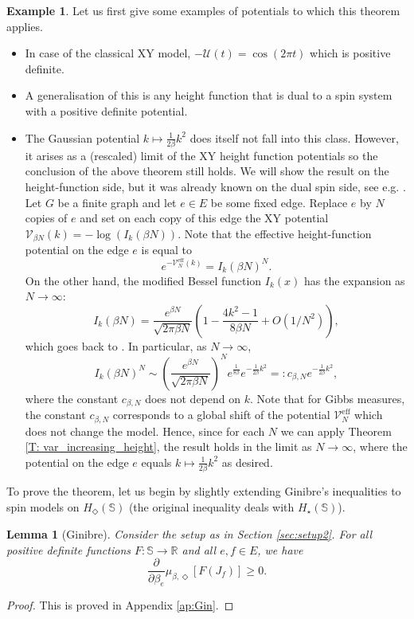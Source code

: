 \documentclass[11pt, reqno]{amsart}
\newtheorem{lemma}[theorem]{Lemma}
\numberwithin{equation}{section}
\theoremstyle{definition}
\newtheorem{example}{Example}
\theoremstyle{remark}
\newcommand{\RR}{\mathbb{R}}
\renewcommand{\c}[1]{\ensuremath{\mathcal{#1}}}
\newcommand{\J}{J}
\newcommand{\exact}{\star}
\newcommand{\coclosed}{\Diamond}
\newcommand{\Hstar}{\ensuremath{H_{\Diamond}} }
\begin{document}
\begin{example} Let us first give some examples of potentials to which this theorem applies. 
	\begin{itemize}
		\item In case of the classical XY model, $-\c{U}(t) = \cos(2\pi t)$ which is positive definite. 
		\item A generalisation of this is any height function that is dual to a spin system with a positive definite potential.
		\item The Gaussian potential $k \mapsto \frac{1}{2\beta} k^2$ does itself not fall into this class. 
		However, it arises as a (rescaled) limit of the XY height function potentials so the conclusion of the above theorem still holds. 
		We will show the result on the height-function side, but it was already known on the dual spin side, see e.g. \cite{NewWu, AHPS}. 
		Let $G$ be a finite graph and let $e \in E$ be some fixed edge. 
		Replace $e$ by $N$ copies of $e$ and set on each copy of this edge the XY potential $\c{V}_{\beta N}(k) = -\log(I_{k}(\beta N))$. 
		Note that the effective height-function potential on the edge $e$ is equal to
		\[
			e^{-\c{V}^{\mathrm{eff}}_N(k)} = I_k(\beta N)^N. 
		\]
		On the other hand, the modified Bessel function $I_k(x)$ has the expansion as $N\to \infty$:
		\[
			I_k(\beta N) = \frac{e^{\beta N}}{ \sqrt{2\pi \beta N}} \left(1 - \frac{4k^2 - 1}{8\beta N} + O(1 / N^2)\right),
		\]
		which goes back to \cite{Kirch_bes}. In particular, as $N \to \infty$, 
		\[
			I_k(\beta N)^N \sim \left(\frac{e^{\beta N}}{ \sqrt{2\pi \beta N}}\right)^N e^{\frac{1}{8 \beta}} e^{- \frac{1}{2\beta}k^2} =: c_{\beta, N} e^{-\frac{1}{2\beta} k^2}, 
		\]
		where the constant $c_{\beta, N}$ does not depend on $k$. 
		Note that for Gibbs measures, the constant $c_{\beta, N}$ corresponds to a global shift of the potential $\c{V}^{\mathrm{eff}}_N$ which does not change the model. 
		Hence, since for each $N$ we can apply Theorem \ref{T: var_increasing_height}, the result holds in the limit as $N \to \infty$, where the potential on the edge $e$ equals $k \mapsto \frac{1}{2\beta}k^2$ as desired. 
	\end{itemize}
\end{example}

To prove the theorem, let us begin by slightly extending Ginibre's inequalities \cite{Gin} to spin models on $\Hstar(\mathbb{S})$ (the original inequality deals with $H_{\exact}(\mathbb{S})$).
\begin{lemma}[Ginibre] \label{L: Ginibre}
		Consider the setup as in Section \ref{sec:setup2}. 
		For all positive definite functions $F:\mathbb{S} \to \RR$ and all $e, f \in E$, we have
		\[
			\frac{\partial}{\partial \beta_e}\mu_{\beta, \coclosed}[F(\J_f)]\geq 0. 
		\]
\end{lemma}
\begin{proof}
	This is proved in Appendix \ref{ap:Gin}. 
\end{proof}
\end{document}
